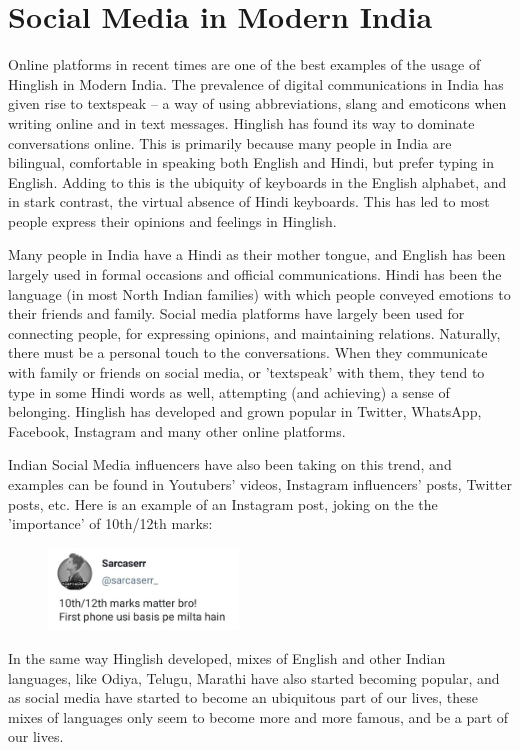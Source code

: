 \documentclass{article}
\begin{document}
\section {Social Media in Modern India}
Online platforms in recent times are one of the best examples of the usage of Hinglish in Modern India. The prevalence of digital communications in India has given rise to textspeak – a way of using abbreviations, slang and emoticons when writing online and in text messages. Hinglish has found its way to dominate conversations online. This is primarily because many people in India are bilingual, comfortable in speaking both English and Hindi, but prefer typing in English. Adding to this is the ubiquity of keyboards in the English alphabet, and in stark contrast, the virtual absence of Hindi keyboards. This has led to most people express their opinions and feelings in Hinglish. 

Many people in India have a Hindi as their mother tongue, and English has been largely used in formal occasions and official communications. Hindi has been the language (in most North Indian families) with which people conveyed emotions to their friends and family. Social media platforms have largely been used for connecting people, for expressing opinions, and maintaining relations. Naturally, there must be a personal touch to the conversations. When they communicate with family or friends on social media, or 'textspeak' with them, they tend to type in some Hindi words as well, attempting (and achieving) a sense of belonging. Hinglish has developed and grown popular in Twitter, WhatsApp, Facebook, Instagram and many other online platforms.

Indian Social Media influencers have also been taking on this trend, and examples can be found in Youtubers' videos, Instagram influencers' posts, Twitter posts, etc. Here is an example of an Instagram post, joking on the the 'importance' of 10th/12th marks:

\begin{figure}[H]
\centering
\includegraphics[width=0.45\textwidth]{images/meme.png}
\end{figure}

In the same way Hinglish developed, mixes of English and other Indian languages, like Odiya, Telugu, Marathi have also started becoming popular, and as social media have started to become an ubiquitous part of our lives, these mixes of languages only seem to become more and more famous, and be a part of our lives.
\end{document}
